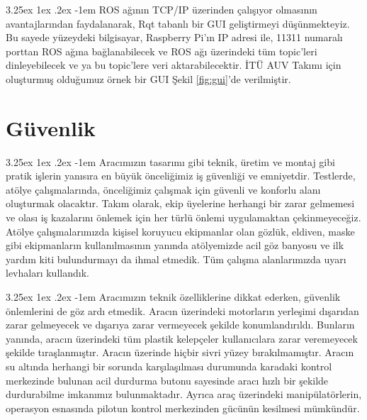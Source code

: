 \documentclass[12pt]{article}
\makeatletter
\renewcommand\paragraph{\@startsection{paragraph}{5}{\z@}%
  {3.25ex \@plus1ex \@minus.2ex}%
  {-1em}%
  {\normalfont\normalsize\bfseries}}
\makeatother
\begin{document}
\paragraph{}  ROS ağının TCP/IP üzerinden çalışıyor olmasının avantajlarından faydalanarak, Rqt tabanlı bir GUI geliştirmeyi düşünmekteyiz. Bu sayede yüzeydeki bilgisayar, Raspberry Pi'ın IP adresi ile, 11311 numaralı porttan ROS ağına bağlanabilecek ve ROS ağı üzerindeki tüm topic'leri dinleyebilecek ve ya bu topic'lere veri aktarabilecektir. İTÜ AUV Takımı için oluşturmuş olduğumuz örnek bir GUI Şekil \ref{fig:gui}'de verilmiştir.


\section{Güvenlik}


\paragraph{} Aracımızın tasarımı gibi teknik, üretim ve montaj gibi pratik işlerin yanısıra en büyük önceliğimiz iş güvenliği ve emniyetdir. Testlerde, atölye çalışmalarında, önceliğimiz çalışmak için güvenli ve konforlu alanı oluşturmak olacaktır. Takım olarak, ekip üyelerine herhangi bir zarar gelmemesi ve olası iş kazalarını önlemek için her türlü önlemi uygulamaktan çekinmeyeceğiz.
Atölye çalışmalarımızda kişisel koruyucu ekipmanlar olan gözlük, eldiven, maske gibi ekipmanların kullanılmasının yanında atölyemizde acil göz banyosu ve ilk yardım kiti bulundurmayı da ihmal etmedik. Tüm çalışma alanlarımızda uyarı levhaları kullandık.

\paragraph{} Aracımızın teknik özelliklerine dikkat ederken, güvenlik önlemlerini de göz ardı etmedik. Aracın üzerindeki motorların yerleşimi dışarıdan zarar gelmeyecek ve dışarıya zarar vermeyecek şekilde konumlandırıldı. Bunların yanında, aracın üzerindeki tüm plastik kelepçeler kullanıcılara zarar veremeyecek şekilde tıraşlanmıştır. Aracın üzerinde hiçbir sivri yüzey bırakılmamıştır. Aracın su altında herhangi bir sorunda karşılaşılması durumunda karadaki kontrol merkezinde bulunan acil durdurma butonu sayesinde aracı hızlı bir şekilde durdurabilme imkanımız bulunmaktadır. Ayrıca araç üzerindeki manipülatörlerin, operasyon esnasında pilotun kontrol merkezinden gücünün kesilmesi mümkündür.
\end{document}
